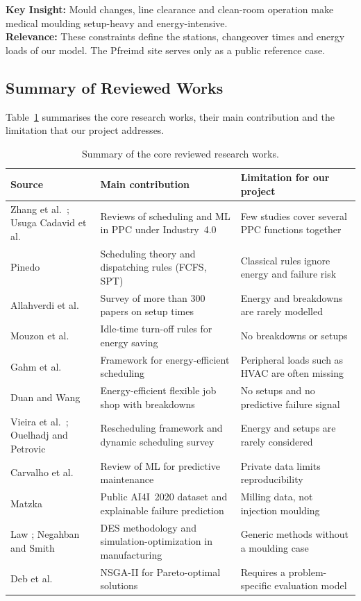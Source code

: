 \documentclass[11pt,a4paper]{article}
\begin{document}
\textbf{Key Insight:} Mould changes, line clearance and clean-room operation make medical moulding setup-heavy and energy-intensive.\\
\textbf{Relevance:} These constraints define the stations, changeover times and energy loads of our model. The Pfreimd site serves only as a public reference case.

\subsection{Summary of Reviewed Works}
Table~\ref{tab:summary} summarises the core research works, their main contribution and the limitation that our project addresses.

\begin{table}[H]
\centering
\small
\begin{tabularx}{\textwidth}{>{\raggedright}p{3.3cm}>{\raggedright}X>{\raggedright\arraybackslash}X}
\toprule
\textbf{Source} & \textbf{Main contribution} & \textbf{Limitation for our project} \\
\midrule
Zhang et al.\ \cite{zhang2019}; Usuga Cadavid et al.\ \cite{usuga2020} & Reviews of scheduling and ML in PPC under Industry~4.0 & Few studies cover several PPC functions together \\
Pinedo \cite{pinedo2016} & Scheduling theory and dispatching rules (FCFS, SPT) & Classical rules ignore energy and failure risk \\
Allahverdi et al.\ \cite{allahverdi2008} & Survey of more than 300 papers on setup times & Energy and breakdowns are rarely modelled \\
Mouzon et al.\ \cite{mouzon2007} & Idle-time turn-off rules for energy saving & No breakdowns or setups \\
Gahm et al.\ \cite{gahm2016} & Framework for energy-efficient scheduling & Peripheral loads such as HVAC are often missing \\
Duan and Wang \cite{duan2021} & Energy-efficient flexible job shop with breakdowns & No setups and no predictive failure signal \\
Vieira et al.\ \cite{vieira2003}; Ouelhadj and Petrovic \cite{ouelhadj2009} & Rescheduling framework and dynamic scheduling survey & Energy and setups are rarely considered \\
Carvalho et al.\ \cite{carvalho2019} & Review of ML for predictive maintenance & Private data limits reproducibility \\
Matzka \cite{matzka2020} & Public AI4I~2020 dataset and explainable failure prediction & Milling data, not injection moulding \\
Law \cite{law2015}; Negahban and Smith \cite{negahban2014} & DES methodology and simulation-optimization in manufacturing & Generic methods without a moulding case \\
Deb et al.\ \cite{deb2002} & NSGA-II for Pareto-optimal solutions & Requires a problem-specific evaluation model \\
\bottomrule
\end{tabularx}
\caption{Summary of the core reviewed research works.}
\label{tab:summary}
\end{table}
\end{document}
